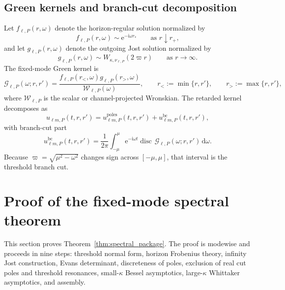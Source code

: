 \documentclass[12pt]{article}
\numberwithin{equation}{section}
\theoremstyle{plain}
\theoremstyle{definition}
\theoremstyle{remark}
\newcommand{\ii}{\mathrm i}
\newcommand{\ee}{\mathrm e}
\newcommand{\dd}{\mathrm d}
\newcommand{\disc}{\operatorname{disc}}
\newcommand{\bc}{\mathrm{bc}}
\newcommand{\cG}{\mathcal G}
\newcommand{\cW}{\mathcal W}
\newcommand{\om}{\omega}
\newcommand{\vp}{\varpi}
\newcommand{\kap}{\kappa}
\begin{document}
\subsection{Green kernels and branch-cut decomposition}

Let $f_{\ell,P}(r,\om)$ denote the horizon-regular solution normalized by
\begin{equation}\label{eq:horizon_condition}
   f_{\ell,P}(r,\om)\sim \ee^{-\ii\om r_*}
   \qquad\text{as }r\downarrow r_+,
\end{equation}
and let $g_{\ell,P}(r,\om)$ denote the outgoing Jost solution normalized by
\begin{equation}\label{eq:infty_condition}
   g_{\ell,P}(r,\om)\sim W_{\kap,\nu_{\ell,P}}(2\vp r)
   \qquad\text{as }r\to\infty.
\end{equation}
The fixed-mode Green kernel is
\begin{equation}\label{eq:green_kernel_def}
   \cG_{\ell,P}(\om;r,r')
   =
   \frac{f_{\ell,P}(r_<,\om)g_{\ell,P}(r_>,\om)}{\cW_{\ell,P}(\om)},
   \qquad
   r_<:=\min\{r,r'\},
   \qquad
   r_>:=\max\{r,r'\},
\end{equation}
where $\cW_{\ell,P}$ is the scalar or channel-projected Wronskian.  The retarded kernel decomposes as
\begin{equation}\label{eq:green_decomposition}
   u_{\ell m,P}(t,r,r')
   =
   u_{\ell m,P}^{\mathrm{poles}}(t,r,r')
   +
   u_{\ell m,P}^{\bc}(t,r,r'),
\end{equation}
with branch-cut part
\begin{equation}\label{eq:bc_formula}
   u_{\ell m,P}^{\bc}(t,r,r')
   =
   \frac{1}{2\pi}\int_{-\mu}^{\mu}
   \ee^{-\ii\om t}\disc\,\cG_{\ell,P}(\om;r,r')\,\dd\om.
\end{equation}
Because $\vp=\sqrt{\mu^2-\om^2}$ changes sign across $[-\mu,\mu]$, that interval is the threshold branch cut.

\section{Proof of the fixed-mode spectral theorem}\label{sec:spectral_theorem_proof}

This section proves Theorem~\ref{thm:spectral_package}.  The proof is modewise and proceeds in nine steps: threshold normal form, horizon Frobenius theory, infinity Jost construction, Evans determinant, discreteness of poles, exclusion of real cut poles and threshold resonances, small-$\kap$ Bessel asymptotics, large-$\kap$ Whittaker asymptotics, and assembly.
\end{document}
